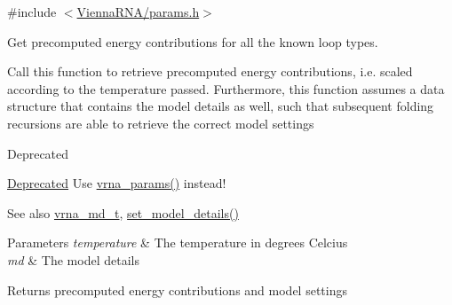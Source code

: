 {\ttfamily \#include $<$\hyperlink{params_8h}{Vienna\+R\+N\+A/params.\+h}$>$}



Get precomputed energy contributions for all the known loop types. 

Call this function to retrieve precomputed energy contributions, i.\+e. scaled according to the temperature passed. Furthermore, this function assumes a data structure that contains the model details as well, such that subsequent folding recursions are able to retrieve the correct model settings

\begin{DoxyRefDesc}{Deprecated}
\item[\hyperlink{deprecated__deprecated000100}{Deprecated}]Use \hyperlink{group__energy__parameters_gad0e3e7e74bdc50d1709d40c92993185e}{vrna\+\_\+params()} instead!\end{DoxyRefDesc}


\begin{DoxySeeAlso}{See also}
\hyperlink{group__model__details_ga1f8a10e12a0a1915f2a4eff0b28ea17c}{vrna\+\_\+md\+\_\+t}, \hyperlink{group__model__details_gabad896c3650d420f3f3ddefc69e2bceb}{set\+\_\+model\+\_\+details()}
\end{DoxySeeAlso}

\begin{DoxyParams}{Parameters}
{\em temperature} & The temperature in degrees Celcius \\
\hline
{\em md} & The model details \\
\hline
\end{DoxyParams}
\begin{DoxyReturn}{Returns}
precomputed energy contributions and model settings 
\end{DoxyReturn}
